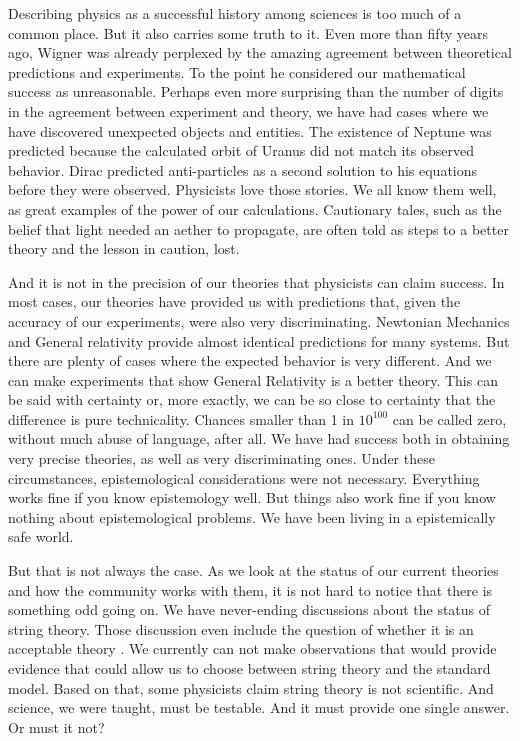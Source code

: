 \documentclass{article}
\begin{document}
	Describing physics as a successful history among sciences is too much of a common place. But it also carries some truth to it. Even more than fifty years ago, Wigner \cite{wigner60a} was already perplexed by the amazing agreement between theoretical predictions and experiments. To the point he considered our mathematical success as unreasonable. Perhaps even more surprising than the number of digits in the agreement between experiment and theory, we have had cases where we have discovered unexpected objects and entities. The existence of Neptune was predicted because the calculated orbit of Uranus did not match its observed behavior. Dirac predicted anti-particles as a second solution to his equations before they were observed. Physicists love those stories.  We all know them well, as great examples of the power of our calculations. Cautionary tales, such as the belief that light needed an aether to propagate, are often told as steps to a better theory and the lesson in caution, lost.
	
	And it is not in the precision of our theories that physicists can claim success. In most cases, our theories have provided us with predictions that, given the accuracy of our experiments, were also very discriminating. Newtonian Mechanics and General relativity provide almost identical predictions for many systems. But there are plenty of cases where the expected behavior is very different. And we can make experiments that show General Relativity is a better theory. This can be said with certainty or, more exactly, we can be so close to certainty that the difference is pure technicality. Chances smaller than 1 in $10^{100}$ can be called zero, without much abuse of language, after all. We have had success both in obtaining very precise theories, as well as very discriminating ones. Under these circumstances, epistemological considerations were not necessary. Everything works fine if you know epistemology well. But things also work fine if you know nothing about epistemological problems. We have been living in a epistemically safe world.
	
	But that is not always the case. As we look at the status of our current theories and how the community works with them, it is not hard to notice that there is something odd going on. We have never-ending discussions about the status of string theory. Those discussion even include the question of whether it is an acceptable theory \cite{ellissilk14a}. We currently can not make observations that would provide evidence that could allow us to choose between string theory and the standard model.  Based on that, some physicists claim string theory is not scientific. And science, we were taught, must be testable. And it must provide one single answer. Or must it not? 
	
\end{document}
